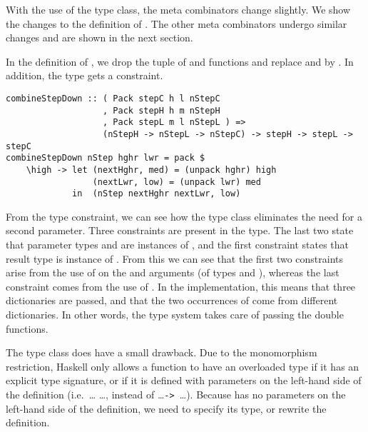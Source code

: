 
With the use of the type class, the meta combinators change slightly. We show the changes to the definition of . The other meta combinators undergo similar changes and are shown in the next section.

In the definition of , we drop the  tuple of   and  functions and replace  and  by . In addition, the type gets a constraint.

\begin{small}
\begin{verbatim}
combineStepDown :: ( Pack stepC h l nStepC 
                   , Pack stepH h m nStepH
                   , Pack stepL m l nStepL ) => 
                   (nStepH -> nStepL -> nStepC) -> stepH -> stepL -> stepC
combineStepDown nStep hghr lwr = pack $
    \high -> let (nextHghr, med) = (unpack hghr) high
                 (nextLwr, low) = (unpack lwr) med
             in  (nStep nextHghr nextLwr, low)
\end{verbatim}
\end{small}

\bc
From the type constraint, we can see how the type class eliminates the need for a second  parameter. Three  constraints are present in the type. The last two state that parameter types  and  are instances of , and the first constraint states that result type  is instance of . From this we can see that the first two constraints arise from the use of  on the  and  arguments (of types  and ), whereas the last constraint comes from the use of . In the implementation, this means that three dictionaries are passed, and that the two occurrences of  come from different dictionaries. In other words, the type system takes care of passing the double  functions.
\ec

The type class does have a small drawback. Due to the monomorphism restriction, Haskell only allows a function to have an overloaded type if it has an explicit type signature, or if it is defined with parameters on the left-hand side of the definition (i.e.\ \dots {} \dots, instead of \dots {}\verb|-> |\dots). Because  has no parameters on the left-hand side of the definition, we need to specify its type, or rewrite the definition.

